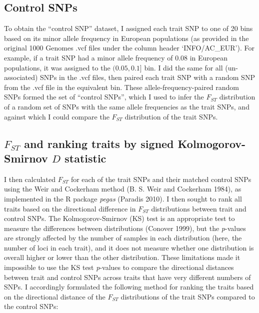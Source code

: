 \documentclass[
]{book}
\begin{document}
\hypertarget{control-snps}{%
\subsection{Control SNPs}\label{control-snps}}

To obtain the ``control SNP'' dataset, I assigned each trait SNP to one of 20 bins based on its minor allele frequency in European populations (as provided in the original 1000 Genomes .vcf files under the column header `INFO/AC\_EUR'). For example, if a trait SNP had a minor allele frequency of 0.08 in European populations, it was assigned to the \((0.05, 0.1]\) bin. I did the same for all (un-associated) SNPs in the .vcf files, then paired each trait SNP with a random SNP from the .vcf file in the equivalent bin. These allele-frequency-paired random SNPs formed the set of ``control SNPs'', which I used to infer the \(F_{ST}\) distribution of a random set of SNPs with the same allele frequencies as the trait SNPs, and against which I could compare the \(F_{ST}\) distribution of the trait SNPs.

\hypertarget{f_st-and-ranking-traits-by-signed-kolmogorov-smirnov-d-statistic}{%
\subsection{\texorpdfstring{\(F_{ST}\) and ranking traits by signed Kolmogorov-Smirnov \(D\) statistic}{F\_\{ST\} and ranking traits by signed Kolmogorov-Smirnov D statistic}}\label{f_st-and-ranking-traits-by-signed-kolmogorov-smirnov-d-statistic}}

I then calculated \(F_{ST}\) for each of the trait SNPs and their matched control SNPs using the Weir and Cockerham method (B. S. Weir and Cockerham 1984), as implemented in the R package \emph{pegas} (Paradis 2010). I then sought to rank all traits based on the directional difference in \(F_{ST}\) distributions between trait and control SNPs. The Kolmogorov-Smirnov (KS) test is an appropriate test to measure the differences between distributions (Conover 1999), but the \emph{p}-values are strongly affected by the number of samples in each distribution (here, the number of loci in each trait), and it does not measure whether one distribution is overall higher or lower than the other distribution. These limitations made it impossible to use the KS test \emph{p}-values to compare the directional distances between trait and control SNPs across traits that have very different numbers of SNPs. I accordingly formulated the following method for ranking the traits based on the directional distance of the \(F_{ST}\) distributions of the trait SNPs compared to the control SNPs:
\end{document}
